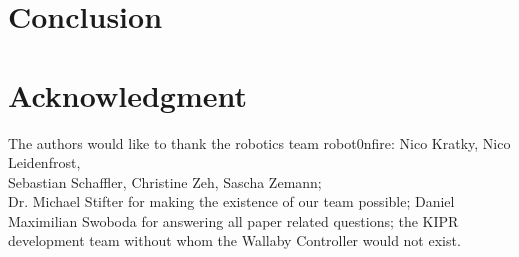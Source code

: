 \documentclass[conference]{IEEEtran}
\begin{document}
\section{Conclusion}



\section*{Acknowledgment}
The authors would like to thank the robotics team robot0nfire: Nico Kratky, Nico Leidenfrost,\\ Sebastian Schaffler, Christine Zeh, Sascha Zemann;\\ Dr. Michael Stifter for making the existence of our team possible; Daniel Maximilian Swoboda for answering all paper related questions; the KIPR development team without whom the Wallaby Controller would not exist.
\end{document}
